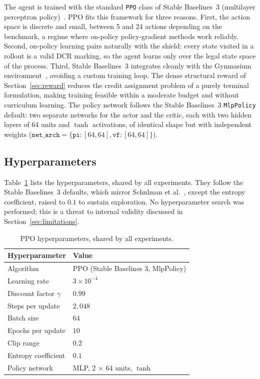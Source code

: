 The agent is trained with the standard \texttt{PPO} class of Stable
Baselines~3 (multilayer perceptron
policy)~\cite{Raffin2021Stable-Baselines3:Implementations}. \ac{PPO} fits this framework for
three reasons. First, the action space is discrete and small, between
5 and 24 actions depending on the benchmark, a regime where on-policy
policy-gradient methods work reliably. Second, on-policy learning
pairs naturally with the shield: every state visited in a rollout is
a valid \ac{DCR} marking, so the agent learns only over the legal
state space of the process. Third, Stable Baselines~3 integrates
cleanly with the Gymnasium environment~\cite{Towers2025Gymnasium:Environments}, avoiding a
custom training loop. The dense structural reward of
Section~\ref{sec:reward} reduces the credit assignment problem of a
purely terminal formulation, making training feasible within a moderate budget and without curriculum learning.
The policy network follows the Stable Baselines~3 \texttt{MlpPolicy}
default: two separate networks for the actor and the critic, each
with two hidden layers of 64 units and $\tanh$ activations, of
identical shape but with independent weights ($\mathtt{net\_arch} = \{\texttt{pi}: [64,64], \texttt{vf}: [64,64]\}$).



\subsection{Hyperparameters}
\label{sec:training_config}

Table~\ref{tab:hyperparams} lists the hyperparameters, shared by all
experiments. They follow the Stable Baselines~3 defaults, which
mirror Schulman et al.~\cite{Schulman2017ProximalAlgorithms}, except
the entropy coefficient, raised to $0.1$ to sustain exploration. No
hyperparameter search was performed; this is a threat to internal
validity discussed in Section~\ref{sec:limitations}.

\begin{table}[H]
\centering
\caption{\ac{PPO} hyperparameters, shared by all experiments.}
\label{tab:hyperparams}
{\renewcommand{\arraystretch}{1.5}
\setlength{\tabcolsep}{14pt}
\begin{tabular}{ll}
\toprule
\textbf{Hyperparameter} & \textbf{Value} \\
\midrule
Algorithm               & PPO (Stable Baselines 3, MlpPolicy) \\
Learning rate           & $3 \times 10^{-4}$ \\
Discount factor $\gamma$ & $0.99$ \\
Steps per update        & $2{,}048$ \\
Batch size              & $64$ \\
Epochs per update       & $10$ \\
Clip range              & $0.2$ \\
Entropy coefficient     & $0.1$ \\
Policy network          & MLP, 2 $\times$ 64 units, $\tanh$ \\
\bottomrule
\end{tabular}}
\end{table}


